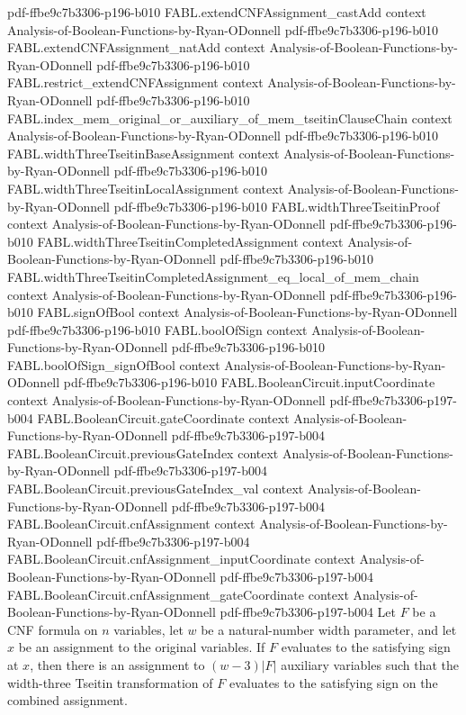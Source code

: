 \begin{theorem}
  {pdf-ffbe9c7b3306-p196-b010}
\proofstep
  {FABL.extendCNFAssignment_castAdd}
  {context}
  {Analysis-of-Boolean-Functions-by-Ryan-ODonnell}
  {pdf-ffbe9c7b3306-p196-b010}
\proofstep
  {FABL.extendCNFAssignment_natAdd}
  {context}
  {Analysis-of-Boolean-Functions-by-Ryan-ODonnell}
  {pdf-ffbe9c7b3306-p196-b010}
\proofstep
  {FABL.restrict_extendCNFAssignment}
  {context}
  {Analysis-of-Boolean-Functions-by-Ryan-ODonnell}
  {pdf-ffbe9c7b3306-p196-b010}
\proofstep
  {FABL.index_mem_original_or_auxiliary_of_mem_tseitinClauseChain}
  {context}
  {Analysis-of-Boolean-Functions-by-Ryan-ODonnell}
  {pdf-ffbe9c7b3306-p196-b010}
\proofstep
  {FABL.widthThreeTseitinBaseAssignment}
  {context}
  {Analysis-of-Boolean-Functions-by-Ryan-ODonnell}
  {pdf-ffbe9c7b3306-p196-b010}
\proofstep
  {FABL.widthThreeTseitinLocalAssignment}
  {context}
  {Analysis-of-Boolean-Functions-by-Ryan-ODonnell}
  {pdf-ffbe9c7b3306-p196-b010}
\proofstep
  {FABL.widthThreeTseitinProof}
  {context}
  {Analysis-of-Boolean-Functions-by-Ryan-ODonnell}
  {pdf-ffbe9c7b3306-p196-b010}
\proofstep
  {FABL.widthThreeTseitinCompletedAssignment}
  {context}
  {Analysis-of-Boolean-Functions-by-Ryan-ODonnell}
  {pdf-ffbe9c7b3306-p196-b010}
\proofstep
  {FABL.widthThreeTseitinCompletedAssignment_eq_local_of_mem_chain}
  {context}
  {Analysis-of-Boolean-Functions-by-Ryan-ODonnell}
  {pdf-ffbe9c7b3306-p196-b010}
\proofstep
  {FABL.signOfBool}
  {context}
  {Analysis-of-Boolean-Functions-by-Ryan-ODonnell}
  {pdf-ffbe9c7b3306-p196-b010}
\proofstep
  {FABL.boolOfSign}
  {context}
  {Analysis-of-Boolean-Functions-by-Ryan-ODonnell}
  {pdf-ffbe9c7b3306-p196-b010}
\proofstep
  {FABL.boolOfSign_signOfBool}
  {context}
  {Analysis-of-Boolean-Functions-by-Ryan-ODonnell}
  {pdf-ffbe9c7b3306-p196-b010}
\proofstep
  {FABL.BooleanCircuit.inputCoordinate}
  {context}
  {Analysis-of-Boolean-Functions-by-Ryan-ODonnell}
  {pdf-ffbe9c7b3306-p197-b004}
\proofstep
  {FABL.BooleanCircuit.gateCoordinate}
  {context}
  {Analysis-of-Boolean-Functions-by-Ryan-ODonnell}
  {pdf-ffbe9c7b3306-p197-b004}
\proofstep
  {FABL.BooleanCircuit.previousGateIndex}
  {context}
  {Analysis-of-Boolean-Functions-by-Ryan-ODonnell}
  {pdf-ffbe9c7b3306-p197-b004}
\proofstep
  {FABL.BooleanCircuit.previousGateIndex_val}
  {context}
  {Analysis-of-Boolean-Functions-by-Ryan-ODonnell}
  {pdf-ffbe9c7b3306-p197-b004}
\proofstep
  {FABL.BooleanCircuit.cnfAssignment}
  {context}
  {Analysis-of-Boolean-Functions-by-Ryan-ODonnell}
  {pdf-ffbe9c7b3306-p197-b004}
\proofstep
  {FABL.BooleanCircuit.cnfAssignment_inputCoordinate}
  {context}
  {Analysis-of-Boolean-Functions-by-Ryan-ODonnell}
  {pdf-ffbe9c7b3306-p197-b004}
\proofstep
  {FABL.BooleanCircuit.cnfAssignment_gateCoordinate}
  {context}
  {Analysis-of-Boolean-Functions-by-Ryan-ODonnell}
  {pdf-ffbe9c7b3306-p197-b004}
Let $F$ be a CNF formula on $n$ variables, let $w$ be a natural-number width parameter,
and let $x$ be an assignment to the original variables. If $F$ evaluates to the
satisfying sign at $x$, then there is an assignment to $(w-3)|F|$ auxiliary variables
such that the width-three Tseitin transformation of $F$ evaluates to the satisfying sign
on the combined assignment.
\end{theorem}

